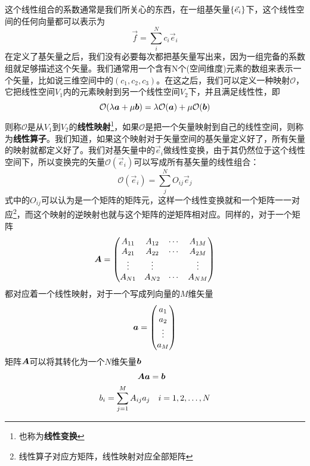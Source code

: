 \documentclass[12pt,a4paper,openany,twoside]{book}
\numberwithin{equation}{section}
\begin{document}
            这个线性组合的系数通常是我们所关心的东西，在一组基矢量$\qty{\vec{e}_i}$下，这个线性空间的任何向量都可以表示为
            \begin{equation}
              \vec{f}=\sum_i^N{c_i\vec{e}_i}
            \end{equation}
            在定义了基矢量之后，我们没有必要每次都把基矢量写出来，因为一组完备的系数组就足够描述这个矢量。我们通常用一个含有N个(空间维度)元素的数组来表示一个矢量，比如说三维空间中的$(c_1,c_2,c_3)$。在这之后，我们可以定义一种映射$\mathcal{O}$，它把线性空间$V_1$内的元素映射到另一个线性空间$V_2$下，并且满足线性性，即
            \begin{equation}
              \mathcal{O}\qty(\lambda\vb*{a}+\mu\vb*{b})=\lambda\mathcal{O}\qty(\vb*{a})+ \mu\mathcal{O}\qty(\vb*{b})
            \end{equation}
            则称$\mathcal{O}$是从$V_1$到$V_2$的\textbf{线性映射}\footnote{也称为\textbf{线性变换}}，如果$\mathcal{O}$是把一个矢量映射到自己的线性空间，则称为\textbf{线性算子}。我们知道，如果这个映射对于矢量空间的基矢量定义好了，所有矢量的映射就都定义好了。我们对基矢量中的$\vec{e}_i$做线性变换，由于其仍然位于这个线性空间下，所以变换完的矢量$\mathcal{O}(\vec{e}_i)$可以写成所有基矢量的线性组合：
            \begin{equation}
              \mathcal{O}(\vec{e}_i)=\sum_j^N{O_{ij}\vec{e}_j}
            \end{equation}
            式中的$O_{ij}$可以认为是一个矩阵的矩阵元，这样一个线性变换就和一个矩阵一一对应\footnote{线性算子对应方矩阵，线性映射对应全部矩阵}，而这个映射的逆映射也就与这个矩阵的逆矩阵相对应。同样的，对于一个矩阵
            \begin{equation}
              \vb*{A}=\mqty(
                A_{11} & A_{12} & \cdots & A_{1 M} \\
                A_{21} & A_{22} & \cdots & A_{2 M} \\
                \vdots & \vdots & {} & \vdots \\
                A_{N 1} & A_{N 2} & \cdots & A_{N M}
              )
            \end{equation}
            都对应着一个线性映射，对于一个写成列向量的$M$维矢量
            \begin{equation}
              \vb*{a}=\mqty(
                a_1 \\
                a_2 \\
                \vdots \\
                a_M
              )
              \label{column vector}
            \end{equation}
            矩阵$\vb*{A}$可以将其转化为一个$N$维矢量$\vb*{b}$
            \begin{equation}
              \begin{aligned}
                \vb*{A} \vb*{a}&=\vb*{b} \\
                b_i=\sum_{j=1}^M{A_{i j} a_j} &\quad i=1,2, \ldots, N
              \end{aligned}
              \label{linear transformation}
            \end{equation}
\end{document}
